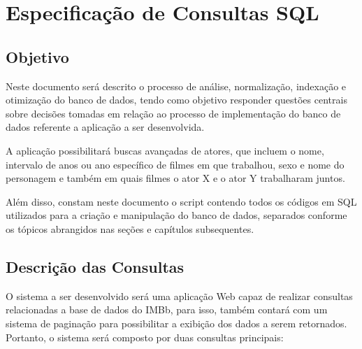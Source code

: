 \documentclass[
	12pt,				%
	oneside,			%
	a4paper,			%
	brazil				%
	]{abntex2}
\begin{document}





\tableofcontents*
\cleardoublepage



\textual





\chapter{Especificação de Consultas SQL}
\section{Objetivo}
	Neste documento será descrito o processo de análise, normalização, indexação e otimização do banco de dados, tendo como objetivo responder questões centrais sobre decisões tomadas em relação ao processo de implementação do banco de dados referente a aplicação a ser desenvolvida.
    
    
   A aplicação possibilitará buscas avançadas de atores, que incluem o nome, intervalo de anos ou ano específico de filmes em que trabalhou, sexo e nome do personagem e também em quais filmes o ator X e o ator Y trabalharam juntos. 
   
   
   Além disso, constam neste documento o script contendo todos os códigos em SQL utilizados para a criação e manipulação do banco de dados, separados conforme os tópicos abrangidos nas seções e capítulos subsequentes.
   
\section{Descrição das Consultas}
O sistema a ser desenvolvido será uma aplicação Web capaz de realizar consultas relacionadas a base de dados do IMBb, para isso, também contará com um sistema de paginação para possibilitar a exibição dos dados a serem retornados. Portanto, o sistema será composto por duas consultas principais:
 
\end{document}
